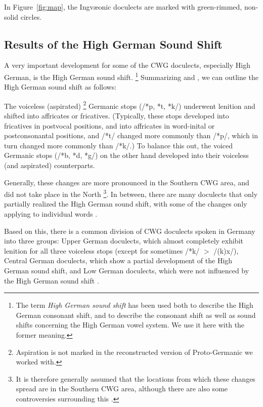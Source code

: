 \documentclass[a4paper]{article}
\begin{document}
In Figure~\ref{fig:map}, the Ingv\ae{}onic doculects
are marked with green-rimmed, non-solid circles.

\subsection{Results of the High German Sound Shift}

A very important development for some of the CWG doculects,
especially High German, is the High German sound shift.%
\footnote{%
The term \textit{High German sound shift} has been used both
to describe the High German consonant shift,
and to describe the consonant shift as well as
sound shifts concerning the High German vowel system.
We use it here with the former meaning.
}
Summarizing \citet[pp. 47--48]{harbert2007germanic}
and \citet[pp. 62--64]{koenig2015dtv},
we can outline the High German sound shift as follows:

The voiceless (aspirated)%
\footnote{%
Aspiration is not marked in the reconstructed version of Proto-Germanic
we worked with.
}
Germanic stops (/*p, *t, *k/)
underwent lenition and shifted into affricates or fricatives.
(Typically, these stops developed into fricatives in postvocal positions,
and into affricates in word-inital or postconsonantal positions,
and /*t/ changed more commonly than /*p/,
which in turn changed more commonly than /*k/.)
To balance this out,
the voiced Germanic stops (/*b, *d, *g/) on the other hand
developed into their voiceless (and aspirated) counterparts.

Generally, these changes are more pronounced
in the Southern CWG area, and did not take place in the North
\cite[p. 33]{noble1983modern}%
\footnote{%
It is therefore generally assumed that the locations
from which these changes spread are in the Southern CWG area,
although there are also some controversies surrounding this
\citep[pp. 155--181]{goblirsch2005lautverschiebungen}.
}.
In between, there are many doculects
that only partially realized the High German sound shift,
with some of the changes only applying to individual words
\citep[p. 63]{koenig2015dtv}.

Based on this, there is a common division
of CWG doculects spoken in Germany into three groups:
Upper German doculects, which almost completely
exhibit lenition for all three voiceless stops
(except for sometimes /*k/ $>$ /(k)x/),
Central German doculects, which show a
partial development of the High German sound shift,
and Low German doculects,
which were not influenced by the High German sound shift
\citep[pp. 33, 55]{noble1983modern}.
\end{document}
